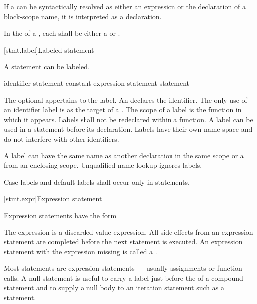 \pnum
If a  can be syntactically resolved as either an
expression or the declaration of a block-scope name, it is interpreted as a
declaration.

\pnum
In the  of a , each
 shall be either a 
or .

[stmt.label]{Labeled statement}%

\pnum
{}%
%
A statement can be labeled.

\begin{bnf}
\br
     identifier \terminal{:} statement\br
      constant-expression \terminal{:} statement\br
      \terminal{:} statement
\end{bnf}

The optional  appertains to the label. An
 declares the identifier. The only use of an
identifier label is as the target of a
%
.
%
The scope of a label is the function in which it appears. Labels shall
not be redeclared within a function. A label can be used in a
 statement before its declaration.
%
Labels have their own name space and do not interfere with other
identifiers.
\begin{note}
A label can have the same name as another declaration in the same scope or a
 from an enclosing scope. Unqualified name
lookup ignores labels.
\end{note}

\pnum
{}%
%
Case labels and default labels shall occur only in  statements.


[stmt.expr]{Expression statement}%

\pnum
Expression statements have the form
\begin{bnf}
\br
     \terminal{;}
\end{bnf}

The expression is
a discarded-value expression.
All
%
side effects from an expression statement
are completed before the next statement is executed.
%
%
An expression statement with the expression missing is called
a .
\begin{note}
Most statements are expression statements --- usually assignments or
function calls. A null statement is useful to carry a label just before
the \tcode{\}} of a compound statement and to supply a null body to an
iteration statement such as a 
statement.
\end{note}

